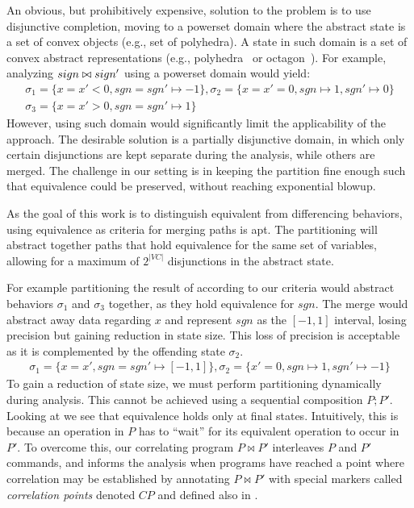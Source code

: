An obvious, but prohibitively expensive, solution to the problem is to use disjunctive completion, moving to a powerset domain where the abstract state is a set of convex objects (e.g., set of polyhedra).
A state in such domain is a set of convex abstract representations (e.g., polyhedra~\cite{CousotHalbwachs78} or octagon~\cite{Mine2006}). For example, analyzing $sign \bowtie sign'$ using a powerset domain would yield:
{\footnotesize
\[
\begin{array}{c}
\sigma_1 = \{x = x' < 0, sgn = sgn' \mapsto -1\} ,
\sigma_2 = \{x = x' = 0, sgn \mapsto 1, sgn' \mapsto 0\}\\
\sigma_3 = \{x = x' > 0, sgn = sgn' \mapsto 1\}
\end{array}
\]
}
However, using such domain would significantly limit the applicability of the approach. The desirable solution is a partially disjunctive domain, in which only certain disjunctions are kept separate during the analysis, while others are merged. The challenge in our setting is in keeping the partition fine enough such that equivalence could be preserved, without reaching exponential blowup.

 As the goal of this work is to distinguish equivalent from differencing behaviors, using equivalence as criteria for merging paths is apt. The partitioning will abstract together paths that hold equivalence for the same set of variables, allowing for a maximum of $2^{|VC|}$ disjunctions in the abstract state.

For example partitioning the result of  according to our criteria would abstract behaviors $\sigma_1$ and $\sigma_3$ together, as they hold equivalence for $sgn$. The merge would abstract away data regarding $x$ and represent $sgn$ as the $[-1,1]$ interval, losing precision but gaining reduction in state size. This loss of precision is acceptable as it is complemented by the offending state $\sigma_2$.
{\footnotesize
\[
\begin{array}{c}
\sigma_1 = \{x = x', sgn = sgn' \mapsto [-1,1]\} ,
\sigma_2 = \{x' = 0, sgn \mapsto 1, sgn' \mapsto -1\}
\end{array}
\]
}
To gain a reduction of state size, we must perform partitioning dynamically during analysis. This cannot be achieved using a sequential composition $P;P'$. Looking at  we see that equivalence holds only at final states. Intuitively, this is because an operation in $P$ has to ``wait'' for its equivalent operation to occur in $P'$. To overcome this, our correlating program $P \bowtie P'$ interleaves $P$ and $P'$ commands, and informs the analysis when programs have reached a point where correlation may be established by annotating $P \bowtie P'$ with special markers called \emph{correlation points} denoted $CP$ and defined also in .


